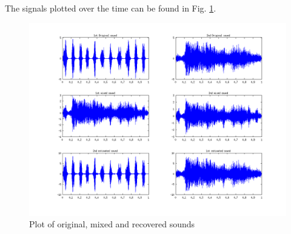 \documentclass{article}
\begin{document}
		The signals plotted over the time can be found in Fig. \ref{fig:soundSignal}.
		\begin{figure}[H]
			\centering
			\includegraphics[width=16cm]{soundSignal.png}
			\caption{Plot of original, mixed and recovered sounds}
			\label{fig:soundSignal}
		\end{figure}
		
\end{document}
